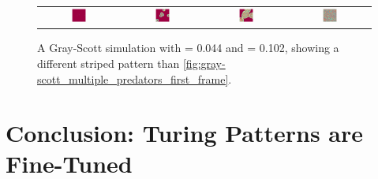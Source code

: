 \begin{figure}[h]
\centering
\mySfFamily
\begin{tabular}{c c c c}
\includegraphics[width = 0.19\textwidth]{../images/f044_k102_multi_Moment_1.jpg} & \includegraphics[width = 0.19\textwidth]{../images/f044_k102_multi_Moment_2.jpg} & \includegraphics[width = 0.19\textwidth]{../images/f044_k102_multi_Moment_3.jpg} & \includegraphics[width = 0.19\textwidth]{../images/f044_k102_multi_Moment_4.jpg}
\end{tabular}
\caption{A Gray-Scott simulation with  = 0.044 and  = 0.102, showing a different striped pattern than \autoref{fig:gray-scott_multiple_predators_first_frame}.}
\label{fig:gray-scott_f44_k102_first_frame}
\end{figure}


\FloatBarrier
{}

\section{Conclusion: Turing Patterns are Fine-Tuned}
\label{sec:conclusion:_turing_patterns_are_fine-tuned}

